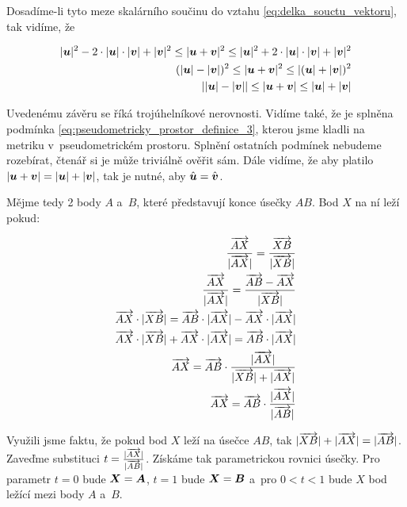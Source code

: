 Dosadíme-li tyto meze skalárního součinu do vztahu \eqref{eq:delka_souctu_vektoru}, tak vidíme, že 

\begin{equation}
\begin{split}
|\boldsymbol{u}|^2 - 2 \cdot |\boldsymbol{u}| \cdot |\boldsymbol{v}| + |\boldsymbol{v}|^2 \leq |\boldsymbol{u} + \boldsymbol{v}|^2 \leq
|\boldsymbol{u}|^2 + 2 \cdot |\boldsymbol{u}| \cdot |\boldsymbol{v}| + |\boldsymbol{v}|^2 \\
(|\boldsymbol{u}| - |\boldsymbol{v}|)^2 \leq |\boldsymbol{u} + \boldsymbol{v}|^2 \leq
|(\boldsymbol{u}|+ |\boldsymbol{v}|)^2 \\
||\boldsymbol{u}| - |\boldsymbol{v}|| \leq |\boldsymbol{u} + \boldsymbol{v}| \leq
|\boldsymbol{u}|+ |\boldsymbol{v}|
\end{split}
\end{equation}

Uvedenému závěru se říká trojúhelníkové nerovnosti.
Vidíme také, že je splněna podmínka \eqref{eq:pseudometricky_prostor_definice_3}, kterou jsme kladli na metriku v~pseudometrickém prostoru. Splnění ostatních podmínek nebudeme rozebírat, čtenář si je může triviálně ověřit sám. Dále vidíme, že aby platilo \(|\boldsymbol{u} + \boldsymbol{v}| = |\boldsymbol{u}| + |\boldsymbol{v}|\), tak
je nutné, aby \(\hat{\boldsymbol{u}} = \hat{\boldsymbol{v}}\).

Mějme tedy 2 body \(A\) a~\(B\), které představují konce úsečky \(AB\). Bod \(X\) na ní leží pokud:

\begin{equation}
\begin{split}
\frac{\overrightarrow{AX}}{|\overrightarrow{AX}|} = \frac{\overrightarrow{XB}}{|\overrightarrow{XB}|} \\
\frac{\overrightarrow{AX}}{|\overrightarrow{AX}|} = \frac{\overrightarrow{AB} - \overrightarrow{AX}}{|\overrightarrow{XB}|} \\
\overrightarrow{AX} \cdot |\overrightarrow{XB}| = \overrightarrow{AB} \cdot |\overrightarrow{AX}| - \overrightarrow{AX} \cdot |\overrightarrow{AX}| \\
\overrightarrow{AX} \cdot |\overrightarrow{XB}| + \overrightarrow{AX} \cdot |\overrightarrow{AX}| = \overrightarrow{AB} \cdot |\overrightarrow{AX}| \\
\overrightarrow{AX} = \overrightarrow{AB} \cdot \frac{|\overrightarrow{AX}|}{|\overrightarrow{XB}| + |\overrightarrow{AX}|} \\
\overrightarrow{AX} = \overrightarrow{AB} \cdot \frac{|\overrightarrow{AX}|}{|\overrightarrow{AB}|}
\end{split}
\end{equation}

Využili jsme faktu, že pokud bod \(X\) leží na úsečce \(AB\), tak \(|\overrightarrow{XB}| + |\overrightarrow{AX}| = |\overrightarrow{AB}|\). Zaveďme substituci \(t = \frac{|\overrightarrow{AX}|}{|\overrightarrow{AB}|}\). Získáme tak parametrickou rovnici úsečky. Pro parametr \(t = 0\) bude \(\boldsymbol{X} = \boldsymbol{A}\), \(t = 1\) bude \(\boldsymbol{X} = \boldsymbol{B}\) a~pro \(0 < t < 1\) bude \(X\) bod ležící mezi body \(A\) a~\(B\).

